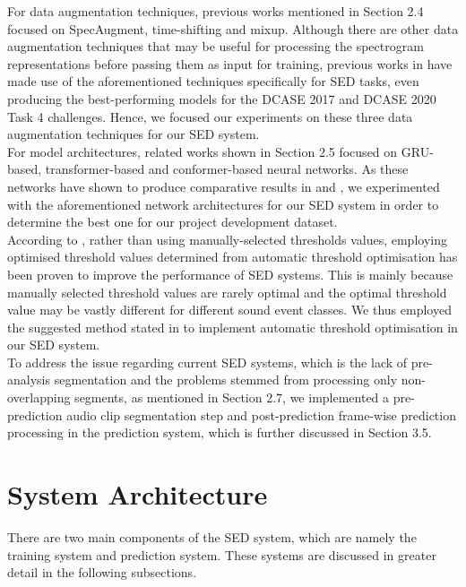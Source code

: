 For data augmentation techniques, previous works mentioned in Section 2.4 focused on SpecAugment, time-shifting and mixup. Although there are other data augmentation techniques that may be useful for processing the spectrogram representations before passing them as input for training, previous works in \cite{kong2020sound, Miyazaki2020CONFORMERBASEDSE} have made use of the aforementioned techniques specifically for SED tasks, even producing the best-performing models for the DCASE 2017 and DCASE 2020 Task 4 challenges. Hence, we focused our experiments on these three data augmentation techniques for our SED system.\\ 

For model architectures, related works shown in Section 2.5 focused on GRU-based, transformer-based and conformer-based neural networks. As these networks have shown to produce comparative results in \cite{kong2020sound} and \cite{Miyazaki2020CONFORMERBASEDSE}, we experimented with the aforementioned network architectures for our SED system in order to determine the best one for our project development dataset.\\

According to \cite{kong2020sound}, rather than using manually-selected thresholds values, employing optimised threshold values determined from automatic threshold optimisation has been proven to improve the performance of SED systems. This is mainly because manually selected threshold values are rarely optimal and the optimal threshold value may be vastly different for different sound event classes. We thus employed the suggested method stated in \cite{kong2020sound} to implement automatic threshold optimisation in our SED system.\\

To address the issue regarding current SED systems, which is the lack of pre-analysis segmentation and the problems stemmed from processing only non-overlapping segments, as mentioned in Section 2.7, we implemented a pre-prediction audio clip segmentation step and post-prediction frame-wise prediction processing in the prediction system, which is further discussed in Section 3.5.

\section{System Architecture}
There are two main components of the SED system, which are namely the training system and prediction system. These systems are discussed in greater detail in the following subsections. 

